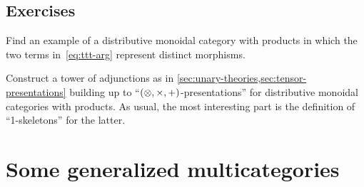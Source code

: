 \subsection*{Exercises}

\begin{ex}\label{ex:moncat-prod-coprod-context}
  Find an example of a distributive monoidal category with products in which the two terms in~\eqref{eq:ttt-arg} represent distinct morphisms.
\end{ex}

\begin{ex}\label{ex:moncat-prod-coprod-pres}
  Construct a tower of adjunctions as in \cref{sec:unary-theories,sec:tensor-presentations} building up to ``$(\tensor,\times,+)$-presentations'' for distributive monoidal categories with products.
  As usual, the most interesting part is the definition of ``1-skeletons'' for the latter.
\end{ex}


\section{Some generalized multicategories}
\label{sec:cartmulti}


